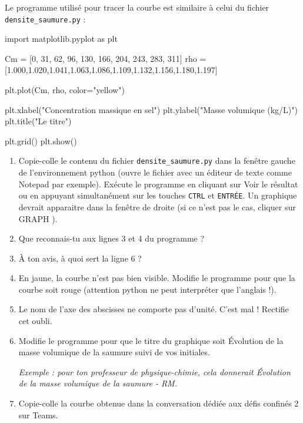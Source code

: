 \documentclass[12pt,a4paper]{article}
\begin{document}
Le programme utilisé pour tracer la courbe est similaire à celui du fichier \texttt{densite\_saumure.py} :
\begin{pyverbatim}[stderr][numbers=left]
import matplotlib.pyplot as plt

Cm  = [0, 31, 62, 96, 130, 166, 204, 243, 283, 311]
rho = [1.000,1.020,1.041,1.063,1.086,1.109,1.132,1.156,1.180,1.197]

plt.plot(Cm, rho, color="yellow")

plt.xlabel("Concentration massique en sel")
plt.ylabel("Masse volumique (kg/L)")
plt.title("Le titre")

plt.grid()
plt.show()
\end{pyverbatim}

\begin{enumerate}
\item Copie-colle le contenu du fichier \texttt{densite\_saumure.py} dans la fenêtre gauche de l'environnement python (ouvre le fichier avec un éditeur de texte comme Notepad par exemple).
Exécute le programme en cliquant sur \og Voir le résultat \fg{} ou en appuyant simultanément sur les touches \texttt{CTRL} et \texttt{ENTRÉE}.
Un graphique devrait apparaitre dans la fenêtre de droite (si ce n'est pas le cas, cliquer sur \og GRAPH \fg{}).

\item Que reconnais-tu aux lignes 3 et 4 du programme ?

\item À ton avis, à quoi sert la ligne 6 ?

\item En jaune, la courbe n'est pas bien visible.
Modifie le programme pour que la courbe soit rouge (attention python ne peut interpréter que l'anglais !).

\item Le nom de l'axe des abscisses ne comporte pas d'unité.
C'est mal !
Rectifie cet oubli.

\item Modifie le programme pour que le titre du graphique soit \og Évolution de la masse volumique de la saumure \fg{} suivi de vos initiales.

\emph{Exemple : pour ton professeur de physique-chimie, cela donnerait \og Évolution de la masse volumique de la saumure - RM. \fg{}}

\item Copie-colle la courbe obtenue dans la conversation dédiée aux défis confinés 2 sur Teams.
\end{enumerate}
\end{document}
